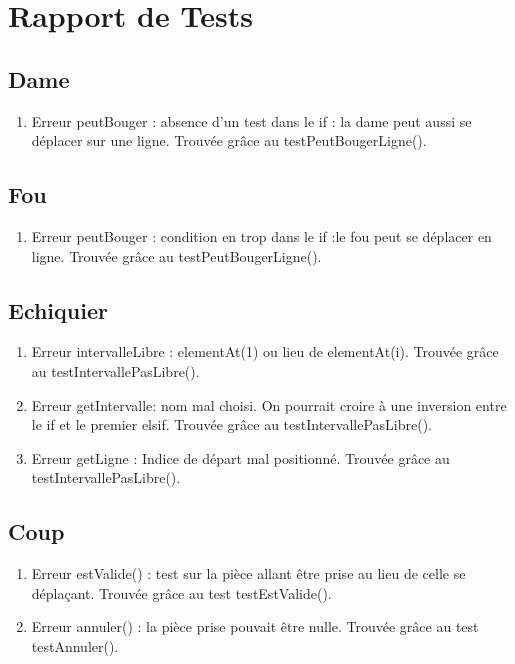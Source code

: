\chapter{Rapport de Tests}
\section{Dame}
\begin{enumerate}
\item
Erreur peutBouger : absence d'un test dans le if : la dame peut aussi se déplacer sur une ligne. Trouvée grâce au testPeutBougerLigne().
\end{enumerate}
\section{Fou}
\begin{enumerate}
\item
Erreur peutBouger : condition en trop dans le if :le fou peut se déplacer en ligne.  Trouvée grâce au testPeutBougerLigne().
\end{enumerate}
\section{Echiquier}
\begin{enumerate}
\item
Erreur intervalleLibre : elementAt(1) ou lieu de elementAt(i). Trouvée grâce au testIntervallePasLibre().
\item
Erreur getIntervalle: nom mal choisi. On pourrait croire à une inversion entre le if et le premier elsif. Trouvée grâce au testIntervallePasLibre().
\item
Erreur getLigne : Indice de départ mal positionné. Trouvée grâce au testIntervallePasLibre().
\end{enumerate}

\section{Coup}
\begin{enumerate}
\item
Erreur estValide() : test sur la pièce allant être prise au lieu de celle se déplaçant. Trouvée grâce au test testEstValide().
\item
Erreur annuler() : la pièce prise pouvait être nulle. Trouvée grâce au test testAnnuler().
\end{enumerate}
